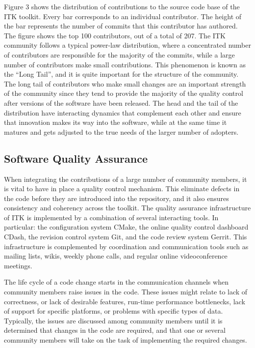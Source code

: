 \documentclass{frontiersENG} %
\begin{document}
Figure 3 shows the distribution of contributions
to the source code base of the ITK toolkit. Every bar corresponds to an individual
contributor. The height of the bar represents the number of commits that this
contributor has authored. The figure shows the top 100 contributors, out of a
total of 207. The ITK community follows a typical power-law distribution, where
a concentrated number of contributors are responsible for the majority of the
commits, while a large number of contributors make small contributions.  This
phenomenon is known as the ``Long Tail'', and it is quite important for the
structure of the community. The long tail of contributors who make small
changes are an important strength of the community since they tend to provide
the majority of the quality control after versions of the software have been
released. The head and the tail of the distribution have interacting dynamics
that complement each other and ensure that innovation makes its way into the
software, while at the same time it matures and gets adjusted to the true needs
of the larger number of adopters.



\subsection{Software Quality Assurance}

When integrating the contributions of a large number of community members, it
is vital to have in place a quality control mechanism. This
eliminate defects in the code before they are introduced into the repository, and
it also ensures consistency and coherency across the toolkit.
The quality assurance infrastructure of ITK is implemented by a combination
of several interacting tools. In particular: the configuration system CMake,
the online quality control dashboard CDash, the revision control system Git,
and the code review system Gerrit. This infrastructure is complemented by
coordination and communication tools such as mailing lists, wikis,
weekly phone calls, and regular online videoconference meetings.

The life cycle of a code change starts in the communication channels when
community members raise issues in the code. These issues might relate to lack
of correctness, or lack of desirable features, run-time performance
bottlenecks, lack of support for specific platforms, or
problems with specific types of data. Typically, the issues are discussed among
community members until it is determined that changes in the code are required,
and that one or several community members will take on the task of
implementing the required changes.
\end{document}
